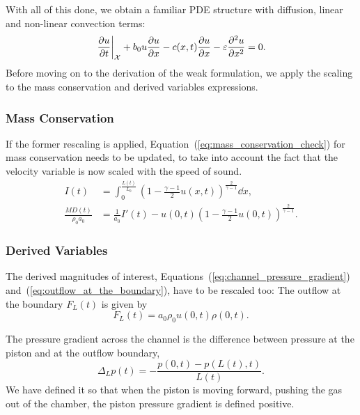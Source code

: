 \documentclass[../../thesis.tex]{subfiles}
\newcommand{\aleX}{\ensuremath{\mathcal{X}}}
\begin{document}
With all of this done, we obtain a familiar PDE structure with diffusion, linear and non-linear convection terms:
\begin{equation}
    \left.\frac{\partial u}{\partial t}\right|_{\aleX} 
    + b_0 u \frac{\partial u}{\partial x} 
    - c(x,t)\frac{\partial u}{\partial x} 
    - \varepsilon  \pdv[2]{u}{x} = 0.
\end{equation}
Before moving on to the derivation of the weak formulation, we apply the scaling to the mass conservation 
and derived variables expressions.

\subsubsection{Mass Conservation}
If the former rescaling is applied, Equation~(\ref{eq:mass_conservation_check}) 
for mass conservation needs to be updated, 
to take into account the fact that the velocity variable is now scaled with the speed of sound.
\begin{subequations}
    \begin{align}
        I(t) &= \int_{0}^{\frac{L(t)}{L_0}} 
        \left(1 - \frac{\gamma-1}{2}u(x,t)\right)^{\frac{2}{\gamma-1}} 
        \dd x, 
        \\
        \frac{MD(t)}{\rho_0 a_0} &= \frac{1}{a_0}I'(t) - u(0,t) \left(1 - \frac{\gamma-1}{2}u(0,t)\right)^{\frac{2}{\gamma-1}}.
    \end{align}    
\end{subequations}

\subsubsection{Derived Variables}
The derived magnitudes of interest, Equations~(\ref{eq:channel_pressure_gradient}) and~(\ref{eq:outflow_at_the_boundary}), have to be rescaled too:
The outflow at the boundary $F_L(t)$ is given by
\begin{equation}
    F_L(t) = a_0 \rho_0 u(0,t) \rho(0,t).
\end{equation}

The pressure gradient across the channel is the difference between pressure at the piston and at the outflow boundary,
\begin{equation}
    \Delta_L p(t) = - \frac{p(0,t) - p(L(t),t)}{L(t)}. 
\end{equation}
We have defined it so that when the piston is moving forward, pushing the gas out of the chamber, the piston pressure gradient is defined positive.
\end{document}
